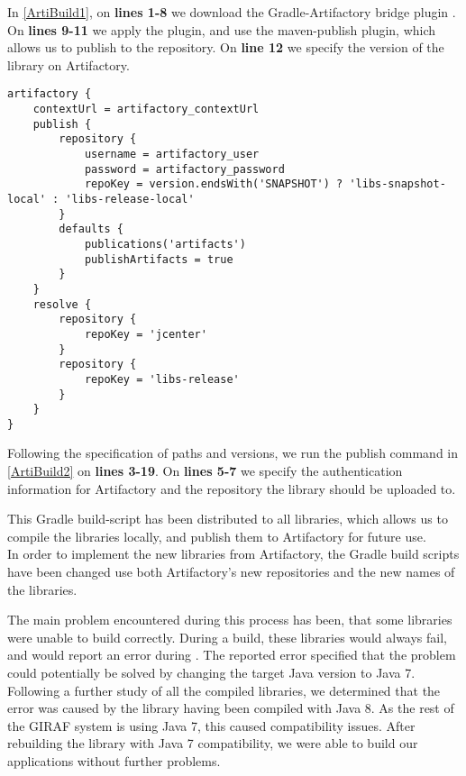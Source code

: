 In \autoref{ArtiBuild1}, on \textbf{lines 1-8} we download the
Gradle-Artifactory bridge plugin \citep{Gradle-Artifactory}. On \textbf{lines
9-11} we apply the plugin, and use the maven-publish plugin, which allows us to
publish to the repository. On \textbf{line 12} we specify the version of the
library on Artifactory.\nl

\begin{minipage}[H]{\linewidth}
\begin{lstlisting}[caption = Publishing the compiled libraries to Artifactory, label = ArtiBuild2] 
artifactory {
    contextUrl = artifactory_contextUrl
    publish {
        repository {
            username = artifactory_user
            password = artifactory_password
            repoKey = version.endsWith('SNAPSHOT') ? 'libs-snapshot-local' : 'libs-release-local'
        }
        defaults {
            publications('artifacts')
            publishArtifacts = true
        }
    }
    resolve {
        repository {
            repoKey = 'jcenter'
        }
        repository {
            repoKey = 'libs-release'
        }
    }
}
\end{lstlisting}
\end{minipage}

Following the specification of paths and versions, we run the publish command in
\autoref{ArtiBuild2} on \textbf{lines 3-19}. On \textbf{lines 5-7} we specify
the authentication information for Artifactory and the repository the library
should be uploaded to.\nl

This Gradle build-script has been distributed to all libraries, which allows us
to compile the libraries locally, and publish them to Artifactory for future
use.\\
In order to implement the new libraries from Artifactory, the Gradle
build scripts have been changed use both Artifactory's new repositories and the
new names of the libraries.\nl

The main problem encountered during this process has been, that some libraries
were unable to build correctly. During a build, these libraries would always
fail, and would report an error during
. The reported error specified
that the problem could potentially be solved by changing the target Java version
to Java 7. Following a further study of all the compiled libraries, we determined
that the error was caused by the  library having been
compiled with Java 8. As the rest of the GIRAF system is using Java 7, this
caused compatibility issues. After rebuilding the library with Java 7
compatibility, we were able to build our applications without further problems.

